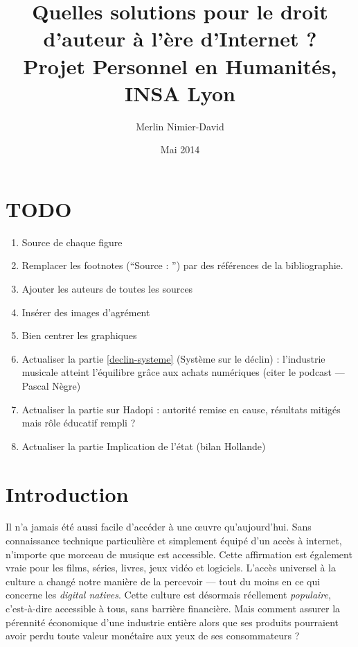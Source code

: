 \documentclass[a4paper]{report}
\title{
	Quelles solutions pour le droit d'auteur à l'ère d'Internet ?\\
	Projet Personnel en Humanités, INSA Lyon
}
\author{Merlin Nimier-David}
\date{Mai 2014}
\begin{document}
	\maketitle

	\tableofcontents

	\chapter{TODO}
	\begin{enumerate}
		\item Source de chaque figure
		\item Remplacer les footnotes (``Source : '') par des références de la bibliographie.
		\item Ajouter les auteurs de toutes les sources
		\item Insérer des images d'agrément
		\item Bien centrer les graphiques
		\item Actualiser la partie \ref{declin-systeme} (Système sur le déclin) : l'industrie musicale atteint l'équilibre grâce aux achats numériques (citer le podcast — Pascal Nègre)
		\item Actualiser la partie sur Hadopi : autorité remise en cause, résultats mitigés mais rôle éducatif rempli ?
		\item Actualiser la partie Implication de l'état (bilan Hollande)
	\end{enumerate}


	\chapter{Introduction}
	Il n'a jamais été aussi facile d'accéder à une œuvre qu'aujourd'hui. Sans connaissance technique particulière et simplement équipé d'un accès à internet, n'importe que morceau de musique est accessible. Cette affirmation est également vraie pour les films, séries, livres, jeux vidéo et logiciels. L'accès universel à la culture a changé notre manière de la percevoir — tout du moins en ce qui concerne les \emph{digital natives}. Cette culture est désormais réellement \emph{populaire}, c'est-à-dire accessible à tous, sans barrière financière. Mais comment assurer la pérennité économique d'une industrie entière alors que ses produits pourraient avoir perdu toute valeur monétaire aux yeux de ses consommateurs ?
\end{document}
